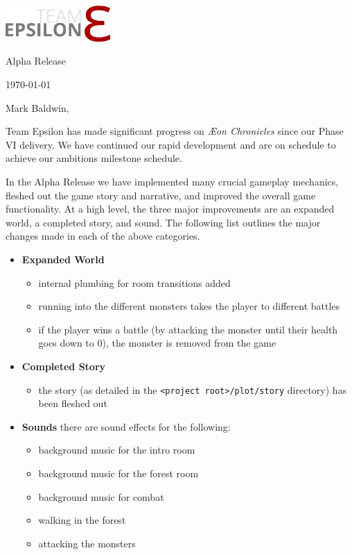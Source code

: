 \documentclass[12pt]{article}
\newcommand\aeon{\textit{\AE on Chronicles}\xspace}
\newcommand\releasename{Alpha Release\xspace}
\newcommand\te{Team Epsilon\xspace}
\begin{document}
\hfill\includegraphics[width=4cm]{../graphics/logo/team-epsilon-light-cropped}

\hfill \releasename

\hfill \today

Mark Baldwin,

\te has made significant progress on \aeon since our Phase VI delivery. We have
continued our rapid development and are on schedule to achieve our ambitions
milestone schedule.

In the \releasename we have implemented many crucial gameplay mechanics, fleshed
out the game story and narrative, and improved the overall game functionality.
At a high level, the three major improvements are an expanded world, a completed
story, and sound. The following list outlines the major changes made in each of
the above categories.

\begin{itemize}
    \item \textbf{Expanded World}
        \begin{itemize}[noitemsep]
            \item internal plumbing for room transitions added
            \item running into the different monsters takes the player to
                different battles
            \item if the player wins a battle (by attacking the monster until
                their health goes down to 0), the monster is removed from the
                game
        \end{itemize}

    \item \textbf{Completed Story}
        \begin{itemize}[noitemsep]
            \item the story (as detailed in the \texttt{<project
                root>/plot/story}
                directory) has been fleshed out
        \end{itemize}

    \item \textbf{Sounds} there are sound effects for the following:
        \begin{itemize}[noitemsep]
            \item background music for the intro room
            \item background music for the forest room
            \item background music for combat
            \item walking in the forest
            \item attacking the monsters
        \end{itemize}
\end{itemize}
\end{document}
